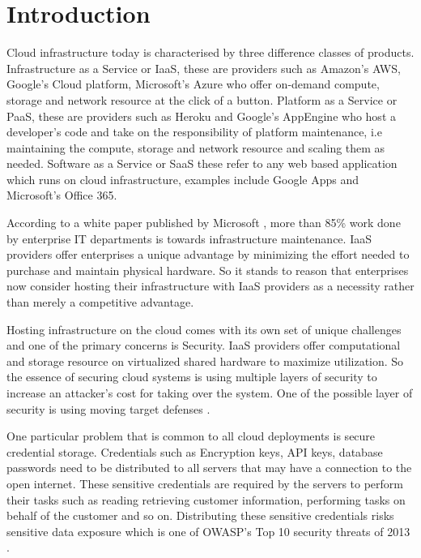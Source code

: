 \documentclass{sig-alternate-05-2015}
\begin{document}
\printccsdesc


\section*{Introduction}

Cloud infrastructure today is characterised by three difference classes of products. Infrastructure as a Service or IaaS, these are providers such as Amazon's AWS, Google's Cloud platform, Microsoft's Azure who offer on-demand compute, storage and network resource at the click of a button.  Platform as a Service or PaaS, these are providers such as Heroku and Google's AppEngine who host a developer's code and take on the responsibility of platform maintenance, i.e maintaining the compute, storage and network resource and scaling them as needed. Software as a Service or SaaS these refer to any web based application which runs on cloud infrastructure, examples include Google Apps and Microsoft's Office 365.

According to a white paper published by Microsoft \cite{harms_economics_2010}, more than 85\% work done by enterprise IT departments is towards infrastructure maintenance. IaaS providers offer enterprises a unique advantage by minimizing the effort needed to purchase and maintain physical hardware. So it stands to reason that enterprises now consider hosting their infrastructure with IaaS providers as a necessity rather than merely a competitive advantage\cite{mcafee_what_2011}.

Hosting infrastructure on the cloud comes with its own set of unique challenges and one of the primary concerns is Security. IaaS providers offer computational and storage resource on virtualized shared hardware to maximize utilization. So the essence of securing cloud systems is using multiple layers \cite{panwar_layered_2011} of security to increase an attacker's cost for taking over the system. One of the possible layer of security is using moving target defenses \cite{evans_effectiveness_2011}. 

One particular problem that is common to all cloud deployments is secure credential storage. Credentials such as Encryption keys, API keys, database passwords need to be distributed to all servers that may have a connection to the open internet. These sensitive credentials are required by the servers to perform their tasks such as reading retrieving customer information, performing tasks on behalf of the customer and so on. Distributing these sensitive credentials risks sensitive data exposure which is one of OWASP's Top 10 security threats of 2013 \cite{wichers_owasp_2014}.
\end{document}
